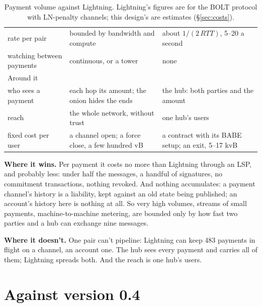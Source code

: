 \documentclass[11pt]{article}
\theoremstyle{plain}
\theoremstyle{definition}
\begin{document}
\begin{table}[!tbp]
\begin{tabularx}{\linewidth}{>{\raggedright\arraybackslash}p{2.7cm}LL}
rate per pair & bounded by bandwidth and compute & about $1/(2\,\mathit{RTT})$, 5--20 a second \\
watching between payments & continuous, or a tower & none \\
\midrule
Around it & & \\
\midrule
who sees a payment & each hop its amount; the onion hides the ends & the hub: both parties and the amount \\
reach & the whole network, without trust & one hub's users \\
fixed cost per user & a channel open; a force close, a few hundred vB & a contract with its BABE setup; an exit, 5--17 kvB \\
\bottomrule
\end{tabularx}
\caption{Payment volume against Lightning. Lightning's figures are for
the BOLT protocol with LN-penalty channels; this design's are
estimates (\S\ref{sec:costs}).}
\label{tab:ln}
\end{table}

\textbf{Where it wins.} Per payment it costs no more than Lightning
through an LSP, and probably less: under half the messages, a handful of
signatures, no commitment transactions, nothing revoked. And nothing
accumulates: a payment channel's history is a liability, kept against an
old state being published; an account's history here is nothing at all.
So very high volumes, streams of small payments, machine-to-machine
metering, are bounded only by how fast two parties and a hub can
exchange nine messages.

\textbf{Where it doesn't.} One pair can't pipeline: Lightning can keep
483 payments in flight on a channel, an account one. The hub sees every
payment and carries all of them; Lightning spreads both. And the reach
is one hub's users.

\section{Against version 0.4}\label{sec:compare}
\end{document}
